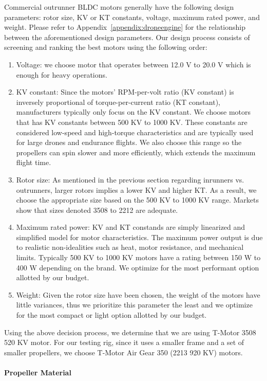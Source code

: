 Commercial outrunner BLDC motors generally have the following design parameters: rotor size, KV or KT constants, voltage, maximum rated power, and weight. Please refer to Appendix~\ref{appendix:droneengine} for the relationship between the aforementioned design parameters. Our design process consists of screening and ranking the best motors using the following order:

\begin{enumerate}
    \item Voltage: we choose motor that operates between 12.0 V to 20.0 V which is enough for heavy operations.
    \item KV constant: Since the motors' RPM-per-volt ratio (KV constant) is inversely proportional of torque-per-current ratio (KT constant), manufacturers typically only focus on the KV constant. We choose motors that has KV constants between 500 KV to 1000 KV. These constants are considered low-speed and high-torque characteristics and are typically used for large drones and endurance flights. We also choose this range so the propellers can spin slower and more efficiently, which extends the maximum flight time.
    \item Rotor size: As mentioned in the previous section regarding inrunners vs. outrunners, larger rotors implies a lower KV and higher KT. As a result, we choose the appropriate size based on the 500 KV to 1000 KV range. Markets show that sizes denoted 3508 to 2212 are adequate.
    \item Maximum rated power: KV and KT constands are simply linearized and simplified model for motor characteristics. The maximum power output is due to realistic non-idealities such as heat, motor resistance, and mechanical limits. Typically 500 KV to 1000 KV motors have a rating between 150 W to 400 W depending on the brand. We optimize for the most performant option allotted by our budget.
    \item Weight: Given the rotor size have been chosen, the weight of the motors have little variances, thus we prioritize this parameter the least and we optimize for the most compact or light option allotted by our budget.
\end{enumerate}

Using the above decision process, we determine that we are using T-Motor 3508 520 KV motor. For our testing rig, since it uses a smaller frame and a set of smaller propellers, we choose T-Motor Air Gear 350 (2213 920 KV) motors.

\paragraph{Propeller Material}

